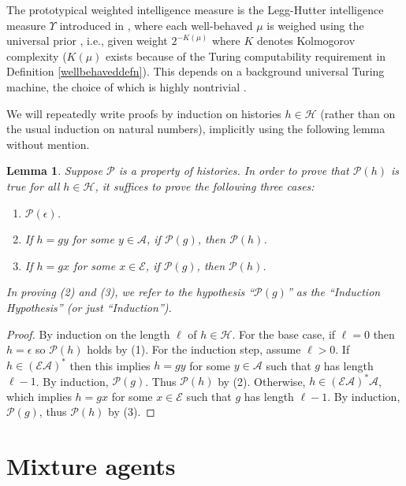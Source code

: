 \documentclass[twoside]{article}
\newtheorem{lemma}[theorem]{Lemma}
\begin{document}
The prototypical weighted intelligence measure is the Legg-Hutter intelligence
measure $\Upsilon$ introduced in \cite{legg2007universal},
where each well-behaved $\mu$ is
weighed using the universal prior \cite{li2008introduction}, i.e.,
given weight $2^{-K(\mu)}$
where $K$ denotes Kolmogorov complexity ($K(\mu)$ exists because of the Turing
computability requirement in Definition \ref{wellbehaveddefn}).
This depends on a background universal
Turing machine, the choice of which is highly nontrivial
\cite{leike2015bad}.

We will repeatedly write proofs by induction on histories $h\in\mathcal H$
(rather than on the usual induction on natural
numbers), implicitly using the following lemma without mention.

\begin{lemma}
\label{trivialinductionlemma}
    Suppose $\mathscr P$ is a property of histories. In order to prove
    that $\mathscr P(h)$ is true
    for all $h\in\mathcal H$, it suffices to prove the following three cases:
    \begin{enumerate}
        \item $\mathscr P(\epsilon)$.
        \item If $h=gy$ for some $y\in\mathcal A$, if $\mathscr P(g)$, then $\mathscr P(h)$.
        \item If $h=gx$ for some $x\in\mathcal E$, if $\mathscr P(g)$, then $\mathscr P(h)$.
    \end{enumerate}
    In proving (2) and (3), we refer to the hypothesis ``$\mathscr P(g)$'' as the
    ``Induction Hypothesis'' (or just ``Induction'').
\end{lemma}

\begin{proof}
    By induction on the length $\ell$ of $h\in\mathcal H$.
    For the base case, if $\ell=0$ then $h=\epsilon$ so $\mathscr P(h)$ holds by (1).
    For the induction step, assume $\ell>0$.
    If $h\in(\mathcal E\mathcal A)^*$ then this implies
    $h=gy$ for some $y\in\mathcal A$ such that $g$ has length $\ell-1$.
    By induction, $\mathscr P(g)$. Thus $\mathscr P(h)$ by (2).
    Otherwise, $h\in(\mathcal E\mathcal A)^*\mathcal A$, which implies
    $h=gx$ for some $x\in\mathcal E$ such that $g$ has length $\ell-1$.
    By induction, $\mathscr P(g)$, thus $\mathscr P(h)$ by (3).
\end{proof}

\section{Mixture agents}
\end{document}
